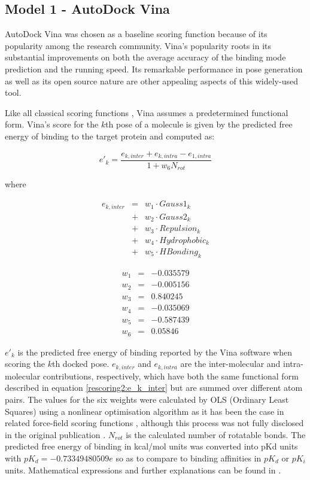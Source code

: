 \documentclass[twocolumn]{bmcart}
\begin{document}
\subsection*{Model 1 - AutoDock Vina}

AutoDock Vina \cite{595} was chosen as a baseline scoring function because of its popularity among the research community. Vina's popularity roots in its substantial improvements on both the average accuracy of the binding mode prediction and the running speed. Its remarkable performance in pose generation as well as its open source nature are other appealing aspects of this widely-used tool.

Like all classical scoring functions \cite{1647}, Vina assumes a predetermined functional form. Vina's score for the $k$th pose of a molecule is given by the predicted free energy of binding to the target protein and computed as:

\begin{equation}
\label{rescoring2:e_k}
e'_k=\frac{e_{k,inter}+e_{k,intra}-e_{1,intra}}{1+w_6N_{rot}}
\end{equation}

where

\begin{eqnarray}
\label{rescoring2:e_k_inter}
e_{k,inter} &=& w_1 \cdot Gauss1_k \nonumber \\
            &+& w_2 \cdot Gauss2_k \nonumber \\
		    &+& w_3 \cdot Repulsion_k \nonumber \\
		    &+& w_4 \cdot Hydrophobic_k \nonumber \\
		    &+& w_5 \cdot HBonding_k
\end{eqnarray}

\begin{eqnarray}
\label{rescoring2:w}
w_1 &=& -0.035579 \nonumber \\
w_2 &=& -0.005156 \nonumber \\
w_3 &=&  0.840245 \nonumber \\
w_4 &=& -0.035069 \nonumber \\
w_5 &=& -0.587439 \nonumber \\
w_6 &=&  0.05846
\end{eqnarray}

$e'_k$ is the predicted free energy of binding reported by the Vina software when scoring the $k$th docked pose. $e_{k,inter}$ and $e_{k,intra}$ are the inter-molecular and intra-molecular contributions, respectively, which have both the same functional form described in equation \ref{rescoring2:e_k_inter} but are summed over different atom pairs. The values for the six weights were calculated by OLS (Ordinary Least Squares) using a nonlinear optimisation algorithm as it has been the case in related force-field scoring functions \cite{1454}, although this process was not fully disclosed in the original publication \cite{595}. $N_{rot}$ is the calculated number of rotatable bonds. The predicted free energy of binding in kcal/mol units was converted into pKd units with $pK_d=-0.73349480509e$ so as to compare to binding affinities in $pK_d$ or $pK_i$ units. Mathematical expressions and further explanations can be found in \cite{1362}.
\end{document}
